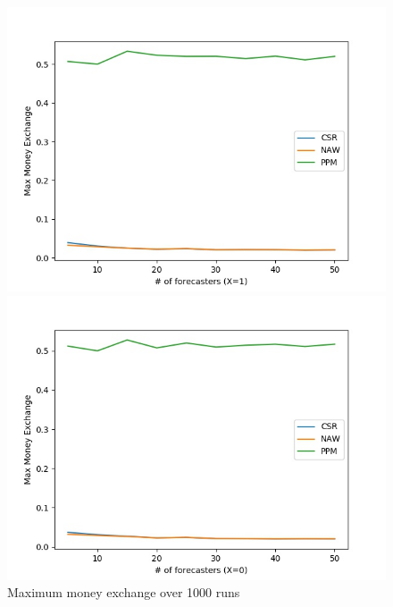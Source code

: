 \documentclass[english,10pt]{article}
\begin{document}
\begin{enumerate}
\begin{enumerate}
        	\begin{figure}[H]
        	\centering
        	\begin{minipage}{0.48\textwidth}
        	\includegraphics[width = \textwidth]{(Beta_100_100)Max_MnEx(X=1).jpg}
        	\end{minipage}
        	\begin{minipage}{0.48\textwidth}
        	\includegraphics[width = \textwidth]{(Beta_100_100)Max_MnEx(X=0).jpg}
        	\end{minipage}
        	\caption{Maximum money exchange over 1000 runs}
        	\end{figure}
        	

\end{enumerate}
\end{enumerate}
\end{document}

